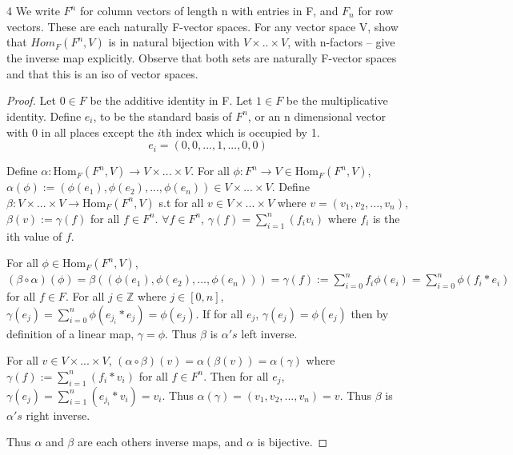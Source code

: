\documentclass{article}
\newcommand{\Z}{\mathbb{Z}}
\newcommand{\rarr}[0]{\rightarrow}
\newcommand{\Hom}[0]{\text{Hom}}
\begin{document}
\begin{PROB}{4}\label{Problem 4.}
	We write $F^n$ for column vectors of length n with entries in F, and $F_n$ for row vectors. These are each naturally F-vector spaces. For any vector space V, show that $Hom_F(F^n,V)$ is in natural bijection with $V \times .. \times V$, with n-factors -- give the inverse map explicitly. Observe that both sets are naturally F-vector spaces and that this is an iso of vector spaces. 
\end{PROB}
\begin{proof}
	Let $0 \in F$ be the additive identity in F. Let $1 \in F$ be the multiplicative identity. Define $e_i$, to be the standard basis of $F^n$, or an n dimensional vector with 0 in all places except the $i$th index which is occupied by 1.
	\begin{equation}
		e_i = (0, 0, ..., 1, ..., 0, 0)
	\end{equation}

	Define $\alpha: \Hom_F(F^n, V) \rarr V \times ... \times V$. For all $\phi: F^n \rarr V \in \Hom_F(F^n, V)$, $\alpha(\phi) := (\phi(e_1), \phi(e_2), ..., \phi(e_n)) \in V \times ... \times V$. Define $\beta: V \times ... \times V \rarr \Hom_F(F^n, V)$ s.t for all $v \in V \times ... \times V$ where $v = (v_1, v_2, ..., v_n)$, $\beta(v) := \gamma(f)$ for all $f \in F^n$. $\forall f \in F^n$, $\gamma(f) = \sum_{i = 1}^{n}(f_iv_i)$ where $f_i$ is the ith value of $f$.

	For all $\phi \in \Hom_F(F^n, V)$, $(\beta \circ \alpha)(\phi) = \beta((\phi(e_1), \phi(e_2), ..., \phi(e_n))) = \gamma(f) := \sum_{i = 0}^{n}f_i\phi(e_i) = \sum_{i = 0}^{n}\phi(f_i*e_i)$ for all $f \in F$. For all $j \in \Z$ where $j \in [0, n]$, $\gamma(e_j) = \sum_{i = 0}^{n}\phi(e_{j_i}*e_j) = \phi(e_j)$. If for all $e_j$, $\gamma(e_j) = \phi(e_j)$ then by definition of a linear map, $\gamma = \phi$. Thus $\beta$ is $\alpha's$ left inverse.

	For all $v \in V \times ... \times V$, $(\alpha \circ \beta)(v) = \alpha(\beta(v)) = \alpha(\gamma)$ where $\gamma(f):= \sum_{i=1}^{n}(f_i * v_i)$ for all $f \in F^n$. Then for all $e_j$, $\gamma(e_j) = \sum_{i=1}^{n}(e_{j_i} * v_i) = v_i$. Thus $\alpha(\gamma) = (v_1, v_2, ..., v_n) = v$. Thus $\beta$ is $\alpha's$ right inverse.

	Thus $\alpha$ and $\beta$ are each others inverse maps, and $\alpha$ is bijective.
\end{proof}

\bigskip
\end{document}
